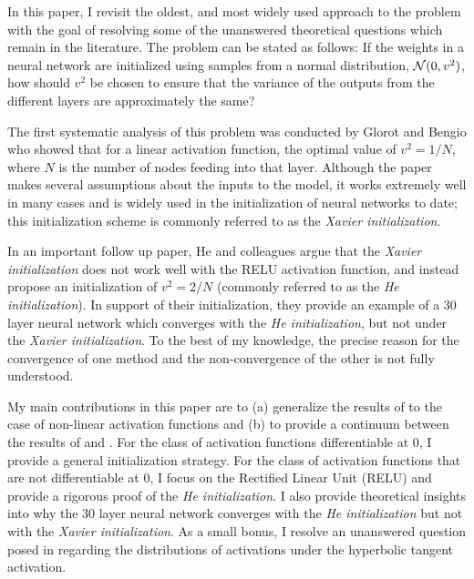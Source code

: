 \documentclass[a4paper]{article}
\begin{document}
In this paper, I revisit the oldest, and most widely used approach to the problem with the goal of resolving some of the unanswered theoretical questions which remain in the literature. The problem can be stated as follows: If the weights in a neural network are initialized using samples from a normal distribution, ${\cal{N}}(0,v^{2})$, how should  $v^{2}$ be chosen to ensure that the variance of the outputs from the different layers are approximately the same?




The first systematic analysis of this problem was conducted by Glorot and Bengio \cite{glorot2010understanding} who showed that for a linear activation function, the optimal value of $v^{2} = 1/N$, where $N$ is the number of nodes feeding into that layer. Although the paper makes several assumptions about the inputs to the model, it works extremely well in many cases and is widely used in the initialization of neural networks to date; this initialization scheme is commonly referred to as the  {\it{Xavier initialization}}.

In an important follow up paper, He and colleagues \cite{he2015delving} argue that the {\it{Xavier initialization}} does not work well with the RELU activation function, and instead propose an initialization of $v^{2} = 2/N$ (commonly referred to as the {\it{He initialization}}). In support of their initialization, they provide an example of a 30 layer neural network which converges with the {\it{He initialization}}, but not under the {\it{Xavier initialization}}. To the best of my knowledge, the precise reason for the convergence of one method and the non-convergence of the other is not fully understood.

My main contributions in this paper are to (a) generalize the results of \cite{glorot2010understanding} to the case of non-linear activation functions and (b) to provide a continuum between the results of \cite{glorot2010understanding} and \cite{he2015delving}. For the class of activation functions differentiable at 0, I provide a general initialization strategy. For the class of activation functions that are not differentiable at 0, I focus on the Rectified Linear Unit (RELU) and provide a rigorous proof of the {\it{He initialization}}. I also provide theoretical insights into why the 30 layer neural network converges with the {\it{He initialization}} but not with the {\it{Xavier initialization}}. As a small bonus, I resolve an unanswered question posed in \cite{glorot2010understanding} regarding the distributions of activations under the hyperbolic tangent activation. 
\end{document}
